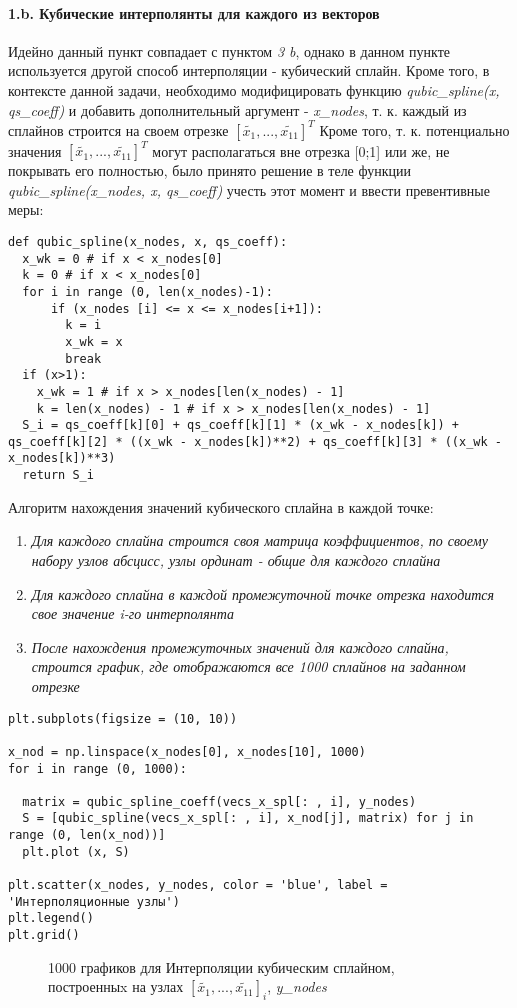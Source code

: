 \paragraph{1.b. Кубические интерполянты для каждого из векторов \\ }
\begin{flushleft}
Идейно данный пункт совпадает с пунктом \textit{3 b}, однако в данном пункте используется другой способ интерполяции - кубический сплайн.
Кроме того, в контексте данной задачи, необходимо модифицировать функцию \textit{qubic_spline(x, qs_coeff)} и добавить дополнительный аргумент - \textit{x_nodes}, т. к. каждый из сплайнов строится на своем отрезке $[\tilde{x_1}, ..., \tilde{x_{11}}]^T$ 
Кроме того, т. к. потенциально значения $[\tilde{x_1}, ..., \tilde{x_{11}}]^T$ могут располагаться вне отрезка [0;1] или же, не покрывать его полностью, было принято решение в теле функции \textit{qubic_spline(x_nodes, x, qs_coeff)} учесть этот момент и ввести превентивные меры:
\begin{lstlisting}
def qubic_spline(x_nodes, x, qs_coeff):
  x_wk = 0 # if x < x_nodes[0]
  k = 0 # if x < x_nodes[0]
  for i in range (0, len(x_nodes)-1):
      if (x_nodes [i] <= x <= x_nodes[i+1]):
        k = i
        x_wk = x
        break
  if (x>1):
    x_wk = 1 # if x > x_nodes[len(x_nodes) - 1]
    k = len(x_nodes) - 1 # if x > x_nodes[len(x_nodes) - 1]
  S_i = qs_coeff[k][0] + qs_coeff[k][1] * (x_wk - x_nodes[k]) + qs_coeff[k][2] * ((x_wk - x_nodes[k])**2) + qs_coeff[k][3] * ((x_wk - x_nodes[k])**3)
  return S_i
\end{lstlisting}
Алгоритм нахождения значений кубического сплайна в каждой точке:
\end{flushleft}
\begin{enumerate}
	\item \textit{Для каждого сплайна строится своя матрица коэффициентов, по своему набору узлов абсцисс, узлы ординат - общие для каждого сплайна}
	\item \textit{Для каждого сплайна в каждой промежуточной точке отрезка находится свое значение i-го интерполянта}
	\item \textit{После нахождения промежуточных значений для каждого слпайна, строится график, где отображаются все 1000 сплайнов на заданном отрезке}
\end{enumerate}
\begin{lstlisting}
plt.subplots(figsize = (10, 10))

x_nod = np.linspace(x_nodes[0], x_nodes[10], 1000) 
for i in range (0, 1000):

  matrix = qubic_spline_coeff(vecs_x_spl[: , i], y_nodes)
  S = [qubic_spline(vecs_x_spl[: , i], x_nod[j], matrix) for j in range (0, len(x_nod))]
  plt.plot (x, S)

plt.scatter(x_nodes, y_nodes, color = 'blue', label = 'Интерполяционные узлы')
plt.legend()
plt.grid()
\end{lstlisting}
\begin{figure}[h]
\caption{1000 графиков для Интерполяции кубическим сплайном, построенныx на узлах $[\tilde{x_1}, ..., \tilde{x_{11}}]_i$, \textit{y_nodes}}
\end{figure}
